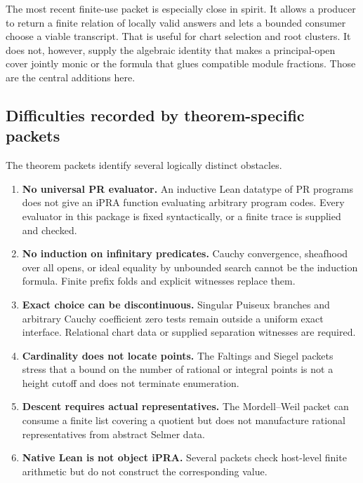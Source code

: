The most recent finite-use packet is especially close in spirit.  It allows a producer to return a
finite relation of locally valid answers and lets a bounded consumer choose a viable transcript.
That is useful for chart selection and root clusters.  It does not, however, supply the algebraic
identity that makes a principal-open cover jointly monic or the formula that glues compatible module
fractions.  Those are the central additions here.

\subsection{Difficulties recorded by theorem-specific packets}

The theorem packets identify several logically distinct obstacles.

\begin{enumerate}[label=\arabic*.]
\item \textbf{No universal PR evaluator.}  An inductive Lean datatype of PR programs does not give
      an iPRA function evaluating arbitrary program codes.  Every evaluator in this package is fixed
      syntactically, or a finite trace is supplied and checked.
\item \textbf{No induction on infinitary predicates.}  Cauchy convergence, sheafhood over all opens,
      or ideal equality by unbounded search cannot be the induction formula.  Finite prefix folds and
      explicit witnesses replace them.
\item \textbf{Exact choice can be discontinuous.}  Singular Puiseux branches and arbitrary Cauchy
      coefficient zero tests remain outside a uniform exact interface.  Relational chart data or
      supplied separation witnesses are required.
\item \textbf{Cardinality does not locate points.}  The Faltings and Siegel packets stress that a
      bound on the number of rational or integral points is not a height cutoff and does not terminate
      enumeration.
\item \textbf{Descent requires actual representatives.}  The Mordell--Weil packet can consume a
      finite list covering a quotient but does not manufacture rational representatives from abstract
      Selmer data.
\item \textbf{Native Lean is not object iPRA.}  Several packets check host-level finite arithmetic
      but do not construct the corresponding  value.
\end{enumerate}

